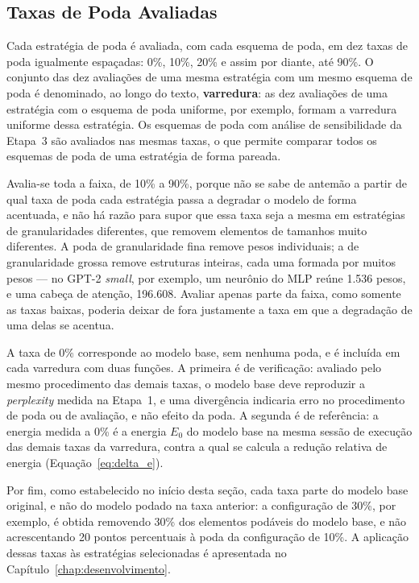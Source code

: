 \subsection{Taxas de Poda Avaliadas}\label{subsec:metodologia_taxas}

Cada estratégia de poda é avaliada, com cada esquema de poda, em dez taxas de poda
igualmente espaçadas: 0\%, 10\%, 20\% e assim por diante, até 90\%. O conjunto das dez
avaliações de uma mesma estratégia com um mesmo esquema de poda é denominado, ao longo do
texto, \textbf{varredura}: as dez avaliações de uma estratégia com o esquema de poda
uniforme, por exemplo, formam a varredura uniforme dessa estratégia. Os esquemas de poda com
análise de sensibilidade da Etapa~3 são avaliados nas mesmas taxas, o que permite comparar
todos os esquemas de poda de uma estratégia de forma pareada.

Avalia-se toda a faixa, de 10\% a 90\%, porque não se sabe de antemão a partir de qual taxa
de poda cada estratégia passa a degradar o modelo de forma acentuada, e não há razão para
supor que essa taxa seja a mesma em estratégias de granularidades diferentes,
que removem elementos de tamanhos muito diferentes. A poda de
granularidade fina remove pesos individuais; a de granularidade grossa remove estruturas
inteiras, cada uma formada por muitos pesos --- no GPT-2 \textit{small}, por exemplo, um
neurônio do MLP reúne 1.536 pesos, e uma cabeça de atenção, 196.608.
Avaliar apenas parte da faixa, como somente as
taxas baixas, poderia deixar de fora justamente a taxa em que a degradação de uma delas se
acentua.

A taxa de 0\% corresponde ao modelo base, sem nenhuma poda, e é incluída em cada varredura
com duas funções. A primeira é de verificação: avaliado pelo mesmo procedimento das demais
taxas, o modelo base deve reproduzir a \textit{perplexity} medida na Etapa~1,
e uma divergência indicaria erro no procedimento de
poda ou de avaliação, e não efeito da poda. A segunda é de referência: a energia medida a
0\% é a energia $E_0$ do modelo base na mesma sessão de execução das demais taxas da
varredura, contra a qual se calcula a redução relativa de energia
(Equação~\ref{eq:delta_e}).

Por fim, como estabelecido no início desta seção, cada taxa parte do modelo base original,
e não do modelo podado na taxa anterior: a configuração de 30\%, por exemplo, é obtida
removendo 30\% dos elementos podáveis do modelo base, e não acrescentando 20 pontos
percentuais à poda da configuração de 10\%. A aplicação dessas taxas às estratégias
selecionadas é apresentada no Capítulo~\ref{chap:desenvolvimento}.

